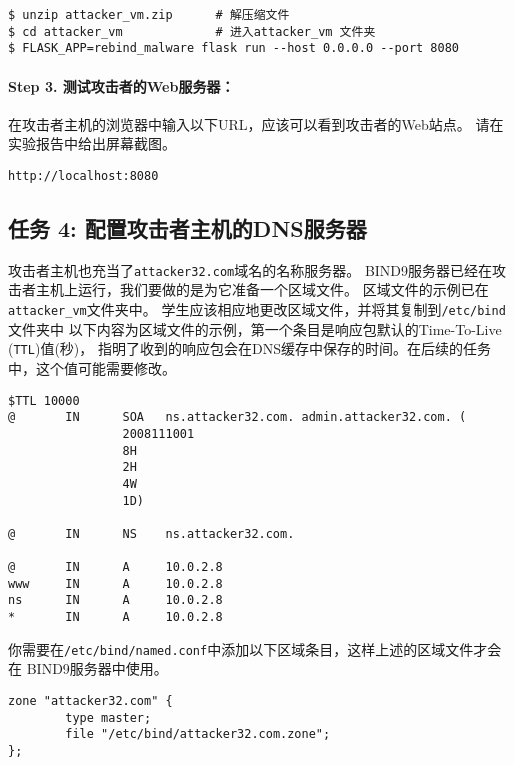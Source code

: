 \begin{lstlisting}
$ unzip attacker_vm.zip      # 解压缩文件
$ cd attacker_vm             # 进入attacker_vm 文件夹
$ FLASK_APP=rebind_malware flask run --host 0.0.0.0 --port 8080
\end{lstlisting}



\paragraph{Step 3. 测试攻击者的Web服务器：}
在攻击者主机的浏览器中输入以下URL，应该可以看到攻击者的Web站点。
请在实验报告中给出屏幕截图。



\begin{lstlisting}
http://localhost:8080
\end{lstlisting}


\subsection{任务 4: 配置攻击者主机的DNS服务器}

攻击者主机也充当了\texttt{attacker32.com}域名的名称服务器。
BIND9服务器已经在攻击者主机上运行，我们要做的是为它准备一个区域文件。
区域文件的示例已在\texttt{attacker\_vm}文件夹中。
学生应该相应地更改区域文件，并将其复制到\texttt{/etc/bind}文件夹中
以下内容为区域文件的示例，第一个条目是响应包默认的Time-To-Live (\texttt{TTL})值(秒)，
指明了收到的响应包会在DNS缓存中保存的时间。在后续的任务中，这个值可能需要修改。


\begin{lstlisting}
$TTL 10000
@       IN      SOA   ns.attacker32.com. admin.attacker32.com. (
                2008111001
                8H
                2H
                4W
                1D)

@       IN      NS    ns.attacker32.com.

@       IN      A     10.0.2.8
www     IN      A     10.0.2.8
ns      IN      A     10.0.2.8
*       IN      A     10.0.2.8
\end{lstlisting}
 

你需要在\texttt{/etc/bind/named.conf}中添加以下区域条目，这样上述的区域文件才会在
BIND9服务器中使用。


\begin{lstlisting}
zone "attacker32.com" {
        type master;
        file "/etc/bind/attacker32.com.zone";
};
\end{lstlisting}
 


